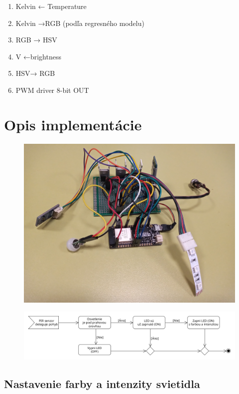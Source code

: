 \documentclass[12pt, a4paper]{article}
\begin{document}
\begin{enumerate}
\item Kelvin ← Temperature
\item Kelvin →RGB (podľa regresného modelu)
\item RGB → HSV
\item V ←brightness
\item HSV→ RGB
\item PWM driver 8-bit OUT
\end{enumerate}

\newpage
\section{Opis implementácie}

\begin{figure}
\includegraphics[width=\textwidth]{assets/prototype.jpg}
\end{figure}

\begin{figure}
\includegraphics[width=\textwidth]{assets/pir-motion-detect.png}
\end{figure}

\subsection{Nastavenie farby a intenzity svietidla}
\end{document}
